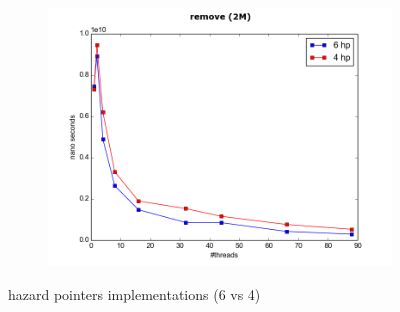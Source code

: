 \documentclass[conference]{IEEEtran}
\begin{document}
\begin{figure}
\begin{subfigure}{.5\textwidth}
			\includegraphics[width=0.45\paperwidth]{hp_comapre/remove_2M_4hp.png}
			\label{fig:4hp_remove}
		\end{subfigure}
		\caption{hazard pointers implementations (6 vs 4)}
		\label{fig:4_hazard_pointers_implementations}
	\end{figure}
\end{document}
